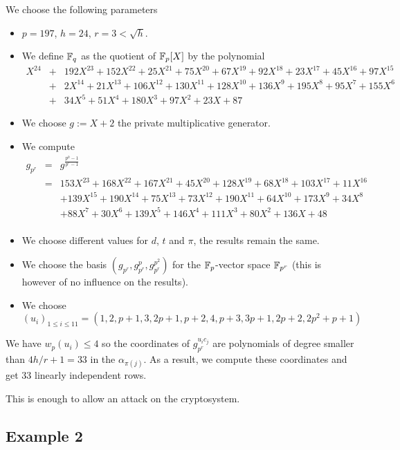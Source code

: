\documentclass[a4paper]{article}
\begin{document}
We choose the following parameters
\begin{itemize}
\item $p = 197$, $h = 24$, $r = 3 < \sqrt{h}$.
\item We define $\mathbb{F}_q$ as the quotient of $\mathbb{F}_p[X]$ by the polynomial
\begin{eqnarray*}
X^{24} &+& 192X^{23} + 152X^{22} + 25X^{21} + 75X^{20} + 67X^{19} + 92X^{18} + 23X^{17} + 45X^{16} + 97X^{15} \\
 &+& 2X^{14} + 21X^{13} + 106X^{12} + 130X^{11} + 128X^{10} + 136X^9 + 195X^8 + 95X^7 + 155X^6 \\
 &+& 34X^5 + 51X^4 + 180X^3 + 97X^2 + 23X + 87
\end{eqnarray*}
\item We choose $g := X + 2$ the private multiplicative generator.
\item We compute
\begin{eqnarray*}
g_{p^r} &=& g^{\frac{p^h-1}{p^r-1}} \\
&=& 153X^{23} + 168X^{22} + 167X^{21} + 45X^{20} + 128X^{19} + 68X^{18} + 103X^{17} + 11X^{16}\\
&&+ 139X^{15} + 190X^{14} + 75X^{13} + 73X^{12} + 190X^{11} + 64X^{10} + 173X^9 + 34X^8 \\
&&+ 88X^7 + 30X^6 + 139X^5 + 146X^4 + 111X^3 + 80X^2 + 136X + 48\\
\end{eqnarray*}
\item We choose different values for $d$, $t$ and $\pi$, the results remain the same.
\item We choose the basis $\left(g_{p^r}, g_{p^r}^p, g_{p^r}^{p^2} \right)$ for the $\mathbb{F}_p$-vector space $\mathbb{F}_{p^r}$ (this is however of no influence on the results).
\item We choose $(u_i)_{1\leq  i \leq 11} = (1,2,p+1,3,2p+1,p+2,4,p+3,3p+1,2p+2,2p^2+p+1)$
\end{itemize}

We have $w_p(u_i) \leq 4$ so the coordinates of $g_{p^r}^{u_i c_j}$ are polynomials of degree smaller than $4 h/r+1 = 33$ in the $\alpha_{\pi(j)}$. As a result, we compute these coordinates and get 33 linearly independent rows.

This is enough to allow an attack on the cryptosystem.

\newpage
\subsection{Example 2}
\label{Ex:2}
\end{document}
